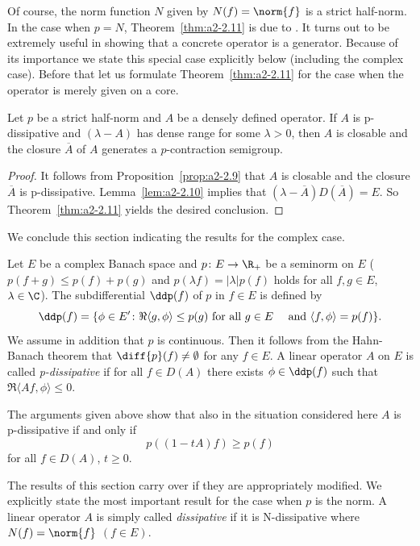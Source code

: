 Of course, the norm function $N$ given by $N(f) = \norm{f}$ is a strict half-norm.
In the case when $p = N$, Theorem~\ref{thm:a2-2.11}    
is due to \textcite{lumerphillips:1961}.
It turns out to be extremely useful in showing that a concrete operator is a generator.
Because of its importance we state this special case explicitly below (including the complex case).
Before that let us formulate Theorem~\ref{thm:a2-2.11}   
for the case when the operator is merely given on a core.

\begin{corollary}\label{cor:a2-2.12}
Let $p$ be a strict half-norm and $A$ be a densely defined operator.
If\/ $A$ is p-dissipative and $(\lambda - A)$ has dense range for some $\lambda > 0$, then $A$ is closable and the closure $\overline{A}$ of\/ $A$ generates a $p$-contraction semigroup.
\end{corollary}
\begin{proof}
It follows from Proposition~\ref{prop:a2-2.9}  
that $A$ is closable and the closure $\overline{A}$ is p-dissipative.
Lemma~\ref{lem:a2-2.10}   
implies that $(\lambda- \overline{A})D(\overline{A}) = E$.
So Theorem~\ref{thm:a2-2.11}   
yields the desired conclusion.
\end{proof}
We conclude this section indicating the results for the complex case.

Let $E$ be a complex Banach space and $p \colon E \to \R_{+}$ 
be a seminorm on $E$ (\ie $p(f + g) \leq p(f) + p(g)$ and $p(\lambda f) = |\lambda|p(f)$ holds for all $f, g \in E$, $\lambda \in \C$).
The subdifferential $\ddp(f)$ of\/ $p$ in $f \in E$ is defined by
\begin{equation}\label{eq:a2-4.15}
\ddp(f) = \{\phi \in E' \colon \Re\langle g,\phi \rangle \leq p(g) \text{ for all } g \in E \quad \text{ and } \langle f,\phi \rangle = p(f)  \}.
\end{equation}
We assume in addition that $p$ is continuous.
Then it follows from the Hahn-Banach theorem that $\diff{p}(f) \neq \emptyset$ for any $f \in E$.
A linear operator $A$ on $E$ is called \emph{p-dissipative} if for all $f \in D(A)$ there exists $\phi \in \ddp(f)$ such that $\Re\langle Af,\phi \rangle \leq 0$.

The arguments given above show that also in the situation considered here $A$ is p-dissipative if and only if
\[
    p((1-tA)f) \geq p(f)
\]
for all $f \in D(A)$, $t \geq 0$.

The results of this section carry over if they are appropriately modified.
We explicitly state the most important result for the case when $p$ is the norm.
A linear operator $A$ is simply called \emph{dissipative} if it is N-dissipative where $N(f) = \norm{f}$ $(f \in E)$.

